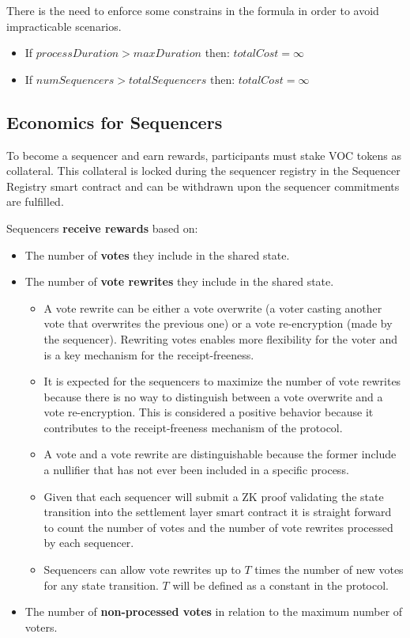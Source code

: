 There is the need to enforce some constrains in the formula in order to avoid impracticable scenarios.

\begin{itemize}
	\item If $processDuration > maxDuration$ then: $totalCost = \infty$
	\item If $numSequencers > totalSequencers$ then: $totalCost = \infty$
\end{itemize}

\subsection{Economics for Sequencers}

To become a sequencer and earn rewards, participants must stake VOC tokens as collateral. This collateral is locked during the sequencer registry in the Sequencer Registry smart contract and can be withdrawn upon the sequencer commitments are fulfilled.

Sequencers \textbf{receive rewards} based on:

\begin{itemize}
	\item The number of \textbf{votes} they include in the shared state.
	\item The number of \textbf{vote rewrites} they include in the shared state.
		\begin{itemize}
			\item A vote rewrite can be either a vote overwrite (a voter casting another vote that overwrites the previous one) or a vote re-encryption (made by the sequencer). Rewriting votes enables more flexibility for the voter and is a key mechanism for the receipt-freeness.
			\item It is expected for the sequencers to maximize the number of vote rewrites because there is no way to distinguish between a vote overwrite and a vote re-encryption. This is considered a positive behavior because it contributes to the receipt-freeness mechanism of the protocol.
			\item A vote and a vote rewrite are distinguishable because the former include a nullifier that has not ever been included in a specific process.
			\item Given that each sequencer will submit a ZK proof validating the state transition into the settlement layer smart contract it is straight forward to count the number of votes and the number of vote rewrites processed by each sequencer.
			\item Sequencers can allow vote rewrites up to $T$ times the number of new votes for any state transition. $T$ will be defined as a constant in the protocol.
		\end{itemize}
	\item The number of \textbf{non-processed votes} in relation to the maximum number of voters.
\end{itemize}

